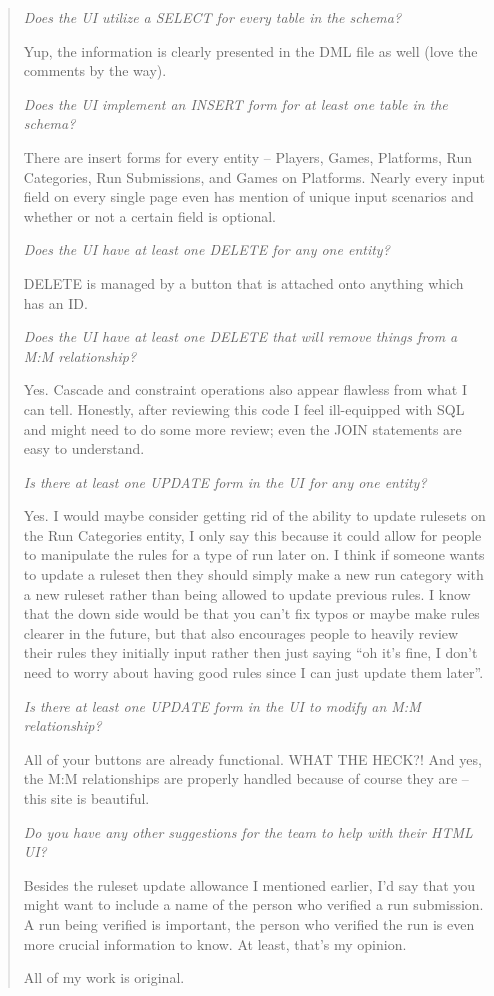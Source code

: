 \documentclass[11pt]{article}
\begin{document}
\begin{quote}
\textit{Does the UI utilize a SELECT for every table in the schema?}

Yup, the information is clearly presented in the DML file as well (love the comments by the way).

\textit{Does the UI implement an INSERT form for at least one table in the schema?}

There are insert forms for every entity -- Players, Games, Platforms, Run Categories, Run Submissions, and Games on Platforms. Nearly every input field on every single page even has mention of unique input scenarios and whether or not a certain field is optional.

\textit{Does the UI have at least one DELETE for any one entity?}

DELETE is managed by a button that is attached onto anything which has an ID.

\textit{Does the UI have at least one DELETE that will remove things from a M:M relationship?}

Yes. Cascade and constraint operations also appear flawless from what I can tell. Honestly, after reviewing this code I feel ill-equipped with SQL and might need to do some more review; even the JOIN statements are easy to understand.

\textit{Is there at least one UPDATE form in the UI for any one entity?}

Yes. I would maybe consider getting rid of the ability to update rulesets on the Run Categories entity, I only say this because it could allow for people to manipulate the rules for a type of run later on. I think if someone wants to update a ruleset then they should simply make a new run category with a new ruleset rather than being allowed to update previous rules. I know that the down side would be that you can't fix typos or maybe make rules clearer in the future, but that also encourages people to heavily review their rules they initially input rather then just saying ``oh it's fine, I don't need to worry about having good rules since I can just update them later''.

\textit{Is there at least one UPDATE form in the UI to modify an M:M relationship?}

All of your buttons are already functional. WHAT THE HECK?! And yes, the M:M relationships are properly handled because of course they are -- this site is beautiful.

\textit{Do you have any other suggestions for the team to help with their HTML UI?}

Besides the ruleset update allowance I mentioned earlier, I'd say that you might want to include a name of the person who verified a run submission. A run being verified is important, the person who verified the run is even more crucial information to know. At least, that's my opinion.

All of my work is original.
\end{quote}
\end{document}
